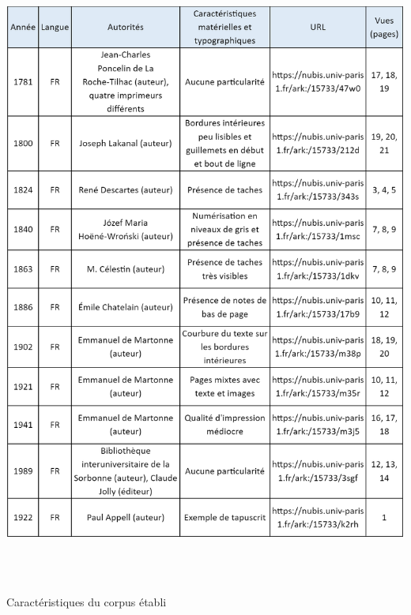 \documentclass[a4paper,12pt,twoside]{book}
\begin{document}
\begin{table} [H]
\includegraphics[width=6in,height=8.11944in]{vertopal_157ae480aa4a4b07be198b586a812241/media/image22.png}	
\caption{Caractéristiques du corpus établi}
\end{table}
\end{document}
